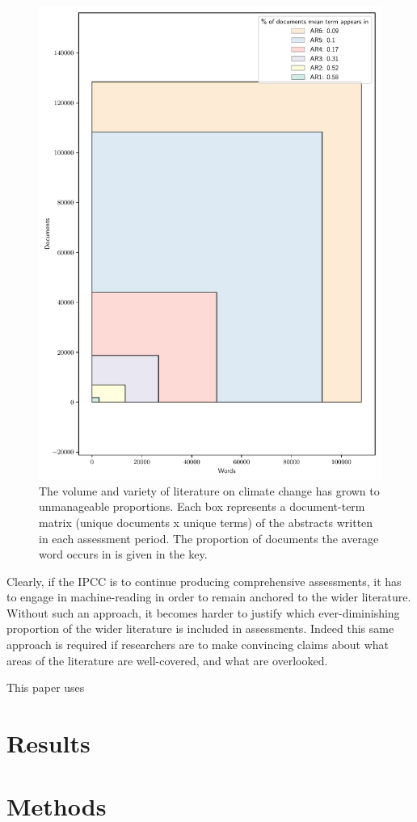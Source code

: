 \documentclass{article}
\begin{document}
\begin{figure}
	\begin{center}
		\includegraphics[width=0.7\linewidth]{plots/volume_variety}
		\caption{The volume and variety of literature on climate change has grown to unmanageable proportions. Each box represents a document-term matrix (unique documents x unique terms) of the abstracts written in each assessment period. The proportion of documents the average word occurs in is given in the key.
		}
		\label{growth}
	\end{center}
\end{figure}
	

Clearly, if the IPCC is to continue producing comprehensive assessments, it has to engage in machine-reading in order to remain anchored to the wider literature. Without such an approach, it becomes harder to justify which ever-diminishing proportion of the wider literature is included in assessments. Indeed this same approach is required if researchers are to make convincing claims about what areas of the literature are well-covered, and what are overlooked.

This paper uses 


\section*{Results}


\begin{figure}
\begin{center}
    \caption{}
    \label{}
    \end{center}
\end{figure}


\section*{Methods}
\label{methods}

\listoffigures
\linespread{1}


\end{document}
